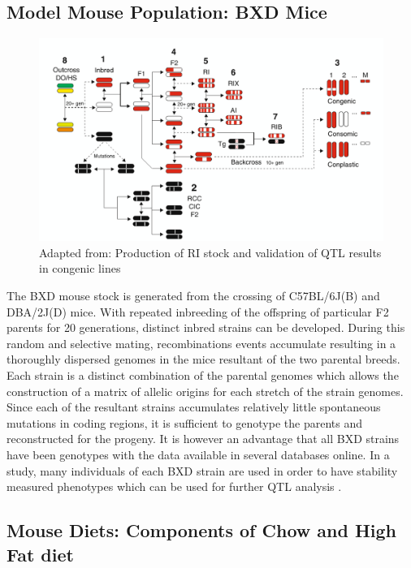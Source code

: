 \documentclass[a4paper,11pt,twoside]{book}
\begin{document}
	\subsection{Model Mouse Population: BXD Mice}
	
	\begin{figure}
		\centering
		\includegraphics[width=\linewidth]{1.Introduction_Figures/BXDs.png}
		\caption{Adapted from:\citep{Williams2017ResourcesGenetics} Production of RI stock and validation of QTL results in congenic lines}
	\end{figure}
	
	The BXD mouse stock is generated from the crossing of C57BL/6J(B) and DBA/2J(D) mice. With repeated inbreeding of the offspring of particular F2 parents for 20 generations, distinct inbred strains can be developed. During this random and selective mating, recombinations events accumulate resulting in a thoroughly dispersed genomes in the mice resultant of the two parental breeds. Each strain is a distinct combination of the parental genomes which allows the construction of a matrix of allelic origins for each stretch of the strain genomes. Since each of the resultant strains accumulates relatively little spontaneous mutations in coding regions, it is sufficient to genotype the parents and reconstructed for the progeny. It is however an advantage that all BXD strains have been genotypes with the data available in several databases online.  In a study, many individuals of each BXD strain are used in order to have stability measured phenotypes which can be used for further QTL analysis \citep{Williams2017ResourcesGenetics}. 
	
	\subsection{Mouse Diets: Components of Chow and High Fat diet}
	
\end{document}
